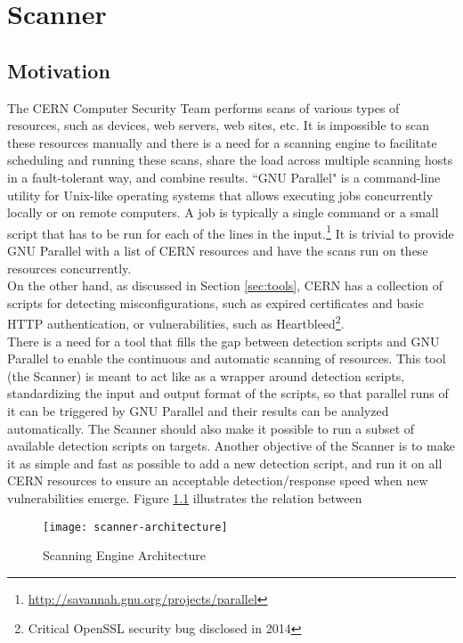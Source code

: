 \chapter{Scanner}
\label{scanner}
\thispagestyle{empty}

\section{Motivation}
\label{scanner_motivation}
The CERN Computer Security Team performs scans of various types of resources, such as devices, web servers, web sites, etc. It is impossible to scan these resources manually and there is a need for a scanning engine to facilitate scheduling and running these scans, share the load across multiple scanning hosts in a fault-tolerant way, and combine results.
``GNU Parallel" is a command-line utility for Unix-like operating systems that allows executing jobs concurrently locally or on remote computers. A job is typically a single command or a small script that has to be run for each of the lines in the input.\footnote{\url{http://savannah.gnu.org/projects/parallel}} It is trivial to provide GNU Parallel with a list of CERN resources and have the scans run on these resources concurrently.
\\ 
On the other hand, as discussed in Section \ref{sec:tools}, CERN has a collection of scripts for detecting misconfigurations, such as expired certificates and basic HTTP authentication, or vulnerabilities, such as Heartbleed\footnote{Critical OpenSSL security bug disclosed in 2014}. 
\\
There is a need for a tool that fills the gap between detection scripts and GNU Parallel to enable the continuous and automatic scanning of resources. This tool (the Scanner) is meant to act like as a wrapper around detection scripts, standardizing the input and output format of the scripts, so that parallel runs of it can be triggered by GNU Parallel and their results can be analyzed automatically. The Scanner should also make it possible to run a subset of available detection scripts on targets. Another objective of the Scanner is to make it as simple and fast as possible to add a new detection script, and run it on all CERN resources to ensure an acceptable detection/response speed when new vulnerabilities emerge. Figure \ref{figure:scanner-arch} illustrates the relation between
\begin{figure}[H]

  \centering
    \texttt{[image: scanner-architecture]}
  \caption{Scanning Engine Architecture}
\label{figure:scanner-arch}
  
\end{figure}

